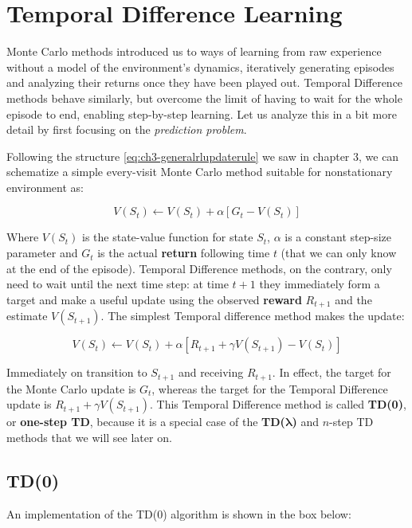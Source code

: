 \chapter{Temporal Difference Learning}
Monte Carlo methods introduced us to ways of learning from raw experience without a model of the environment’s dynamics, iteratively generating episodes and analyzing their returns once they have been played out. Temporal Difference methods behave similarly, but overcome the limit of having to wait for the whole episode to end, enabling step-by-step learning. Let us analyze this in a bit more detail by first focusing on the \textit{prediction problem}.

Following the structure \eqref{eq:ch3-generalrlupdaterule} we saw in chapter 3, we can schematize a simple every-visit Monte Carlo method suitable for nonstationary environment as:

\begin{equation*}
    V(S_t) \leftarrow V(S_t) + \alpha \left[ G_t - V(S_t) \right]
\end{equation*}

Where $V(S_t)$ is the state-value function for state $S_t$, $\alpha$ is a constant step-size parameter and $G_t$ is the actual \textbf{return} following time $t$ (that we can only know at the end of the episode). Temporal Difference methods, on the contrary, only need to wait until the next time step: at time $t+1$ they immediately form a target and make a useful update using the observed \textbf{reward} $R_{t+1}$ and the estimate $V(S_{t+1})$. The simplest Temporal difference method makes the update:

\begin{equation}
    V(S_t) \leftarrow V(S_t) + \alpha \left[ R_{t+1} + \gamma V(S_{t+1}) - V(S_t) \right]
    \label{eq:ch5-genericonpolicytdupdate}
\end{equation}

Immediately on transition to $S_{t+1}$ and receiving $R_{t+1}$. In effect, the target for the Monte Carlo update is $G_t$, whereas the target for the Temporal Difference update is $R_{t+1} + \gamma V(S_{t+1})$. This Temporal Difference method is called \textbf{TD(0)}, or \textbf{one-step TD}, because it is a special case of the \textbf{TD(}$\boldsymbol{\lambda}$\textbf{)} and $n$-step TD methods that we will see later on.

\section{TD(0)}
An implementation of the TD(0) algorithm is shown in the box below:

